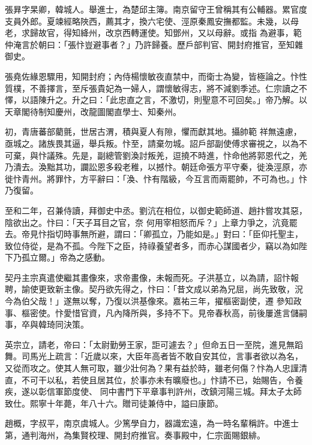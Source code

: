 \begin{pinyinscope}
 張昪字杲卿，韓城人。舉進士，為楚邱主簿。南京留守王曾稱其有公輔器。累官度支員外郎。夏竦經略陜西，薦其才，換六宅使、涇原秦鳳安撫都監。未幾，以母老，求歸故官，得知絳州，改京西轉運使。知鄧州，又以母辭。或指
 為避事，範仲淹言於朝曰：「張忭豈避事者？」乃許歸養。歷戶部判官、開封府推官，至知雜御史。



 張堯佐緣恩驟用，知開封府；內侍楊懷敏夜直禁中，而衛士為變，皆極論之。忭性質樸，不善擇言，至斥張貴妃為一婦人，謂懷敏得志，將不減劉季述。仁宗讀之不懌，以語陳升之。升之曰：「此忠直之言，不激切，則聖意不可回矣。」帝乃解。以天章閣待制知慶州，改龍圖閣直學士、知秦州。



 初，青唐蕃部藺氈，世居古渭，積與夏人有隙，懼而獻其地。攝帥範
 祥無遠慮，亟城之。諸族畏其逼，舉兵叛。忭至，請棄勿城。詔戶部副使傅求審視之，以為不可棄，與忭議殊。先是，副總管劉渙討叛羌，逗撓不時進，忭命他將郭恩代之，羌乃潰去。渙黜其功，讕訟恩多殺老稚，以撼忭。朝廷命張方平守秦，徙渙涇原，亦徙忭青州。將罪忭，方平辭曰：「渙、忭有階級，今互言而兩罷帥，不可為也。」忭乃復留。



 至和二年，召兼侍讀，拜御史中丞。劉沆在相位，以御史範師道、趙抃嘗攻其惡，陰欲出之。忭曰：「天子耳目之官，奈
 何用宰相怒而斥？」上章力爭之，沆竟罷去。帝見忭指切時事無所避，謂曰：「卿孤立，乃能如是。」對曰：「臣仰托聖主，致位侍從，是為不孤。今陛下之臣，持祿養望者多，而赤心謀國者少，竊以為如陛下乃孤立爾。」帝為之感動。



 契丹主宗真遣使繼其畫像來，求帝畫像，未報而死。子洪基立，以為請，詔忭報聘，諭使更致新主像。契丹欲先得之，忭曰：「昔文成以弟為兄屈，尚先致敬，況今為伯父哉！」遂無以奪，乃復以洪基像來。嘉祐三年，擢樞密副使，遷
 參知政事、樞密使。忭愛惜官資，凡內降所與，多持不下。見帝春秋高，前後屢進言儲嗣事，卒與韓琦同決策。



 英宗立，請老，帝曰：「太尉勤勞王家，詎可遽去？」但命五日一至院，進見無蹈舞。司馬光上疏言：「近歲以來，大臣年高者皆不敢自安其位，言事者欲以為名，又從而攻之。使其人無可取，雖少壯何為？果有益於時，雖老何傷？忭為人忠謹清直，不可干以私，若使且居其位，於事亦未有曠廢也。」忭請不已，始賜告，令養疾，遂以彰信軍節度使、
 同中書門下平章事判許州，改鎮河陽三城。拜太子太師致仕。熙寧十年薨，年八十六。贈司徒兼侍中，謚曰康節。



 趙概，字叔平，南京虞城人。少篤學自力，器識宏遠，為一時名輩稱許。中進士第，通判海州，為集賢校理、開封府推官。奏事殿中，仁宗面賜銀緋。




\end{pinyinscope}
